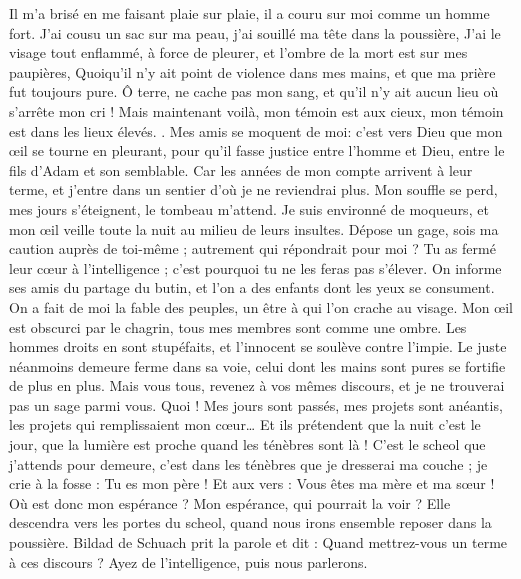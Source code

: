 \begin{multicols}{2}
Il m'a brisé en me faisant plaie sur plaie, il a couru sur moi comme un homme fort.
J'ai cousu un sac sur ma peau, j'ai souillé ma tête dans la poussière,
J'ai le visage tout enflammé, à force de pleurer, et l'ombre de la mort est sur mes paupières, 
Quoiqu'il n'y ait point de violence dans mes mains, et que ma prière fut toujours pure.
Ô terre, ne cache pas mon sang, et qu'il n'y ait aucun lieu où s'arrête mon cri !
Mais maintenant voilà, mon témoin est aux cieux, mon témoin est dans les lieux élevés. .
Mes amis se moquent de moi: c'est vers Dieu que mon œil se tourne en pleurant,
pour qu'il fasse justice entre l'homme et Dieu, entre le fils d'Adam et son semblable.
Car les années de mon compte arrivent à leur terme, et j'entre dans un sentier d'où je ne reviendrai plus. 
\VerseOne{}Mon souffle se perd, mes jours s'éteignent, le tombeau m'attend.
Je suis environné de moqueurs, et mon œil veille toute la nuit au milieu de leurs insultes.
Dépose un gage, sois ma caution auprès de toi-même ; autrement qui répondrait pour moi ?
Tu as fermé leur cœur à l'intelligence ; c'est pourquoi tu ne les feras pas s'élever.
On informe ses amis du partage du butin, et l'on a des enfants dont les yeux se consument.
On a fait de moi la fable des peuples, un être à qui l'on crache au visage.
Mon œil est obscurci par le chagrin, tous mes membres sont comme une ombre.
Les hommes droits en sont stupéfaits, et l'innocent se soulève contre l'impie.
Le juste néanmoins demeure ferme dans sa voie, celui dont les mains sont pures se fortifie de plus en plus.
Mais vous tous, revenez à vos mêmes discours, et je ne trouverai pas un sage parmi vous.
Quoi ! Mes jours sont passés, mes projets sont anéantis, les projets qui remplissaient mon cœur…
Et ils prétendent que la nuit c'est le jour, que la lumière est proche quand les ténèbres sont là !
C'est le scheol que j'attends pour demeure, c'est dans les ténèbres que je dresserai ma couche ;
je crie à la fosse : Tu es mon père ! Et aux vers : Vous êtes ma mère et ma sœur !
Où est donc mon espérance ? Mon espérance, qui pourrait la voir ?
Elle descendra vers les portes du scheol, quand nous irons ensemble reposer dans la poussière.
\VerseOne{}Bildad de Schuach prit la parole et dit :
Quand mettrez-vous un terme à ces discours ? Ayez de l'intelligence, puis nous parlerons.

\end{multicols}
